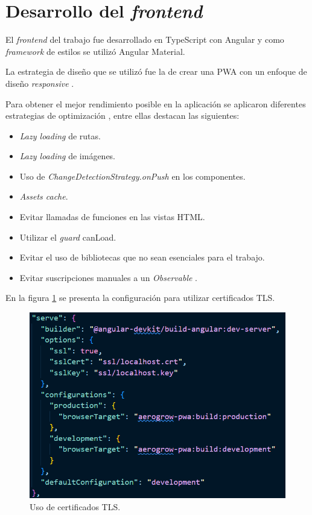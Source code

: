 \section{Desarrollo del \emph{frontend}}
El \emph{frontend} del trabajo fue desarrollado en TypeScript con Angular y como \textit{framework} de estilos se utilizó Angular Material.

La estrategia de diseño que se utilizó fue la de crear una PWA con un enfoque de diseño \emph{responsive} \citep{WEBSITE:RESPONSIVE}.

Para obtener el mejor rendimiento posible en la aplicación se aplicaron diferentes estrategias de optimización \citep{WEBSITE:ANGULAROPTIMIZACION1} \citep{WEBSITE:ANGULAROPTIMIZACION2}, entre ellas destacan las siguientes:
\begin{itemize}
	\item \emph{Lazy loading} de rutas.
	\item \emph{Lazy loading} de imágenes.
	\item Uso de \textit{ChangeDetectionStrategy.onPush} en los componentes.
	\item \textit{Assets cache}.
	\item Evitar llamadas de funciones en las vistas HTML.
	\item Utilizar el \emph{guard} canLoad.
	\item Evitar el uso de bibliotecas que no sean esenciales para el trabajo.
	\item Evitar suscripciones manuales a un \textit{Observable} \citep{WEBSITE:OBSERVABLE}. 
\end{itemize}

En la figura \ref{fig:certificadosTLSDelFrontend} se presenta la configuración para utilizar certificados TLS.

\begin{figure}[H]
	\centering
	\includegraphics[width=.6\textwidth]{./Figures/Certificados TLS en Angular.png}
	\caption{Uso de certificados TLS.}
	\label{fig:certificadosTLSDelFrontend}
\end{figure}

